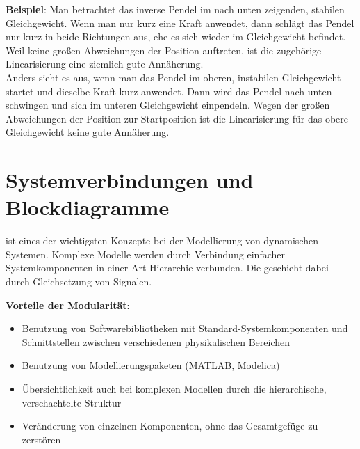 \linie

\textbf{Beispiel}:
Man betrachtet das inverse Pendel im nach unten zeigenden, stabilen Gleichgewicht.
Wenn man nur kurz eine Kraft anwendet, dann schlägt das Pendel nur kurz in beide Richtungen
aus, ehe es sich wieder im Gleichgewicht befindet.
Weil keine großen Abweichungen der Position auftreten, ist die zugehörige Linearisierung eine
ziemlich gute Annäherung.\\
Anders sieht es aus, wenn man das Pendel im oberen, instabilen Gleichgewicht startet
und dieselbe Kraft kurz anwendet.
Dann wird das Pendel nach unten schwingen und sich im unteren Gleichgewicht einpendeln.
Wegen der großen Abweichungen der Position zur Startposition ist die Linearisierung für
das obere Gleichgewicht keine gute Annäherung.

\pagebreak

\section{%
    Systemverbindungen und Blockdiagramme%
}

 ist eines der wichtigsten Konzepte bei der Modellierung von
dynamischen Systemen.
Komplexe Modelle werden durch Verbindung einfacher Systemkomponenten in einer Art Hierarchie
verbunden.
Die  geschieht dabei durch Gleichsetzung von Signalen.

\textbf{Vorteile der Modularität}:
\begin{itemize}
    \item
    Benutzung von Softwarebibliotheken mit Standard-Systemkomponenten und
    Schnittstellen zwischen verschiedenen physikalischen Bereichen

    \item
    Benutzung von Modellierungspaketen (MATLAB, Modelica)

    \item
    Übersichtlichkeit auch bei komplexen Modellen durch die hierarchische, verschachtelte
    Struktur

    \item
    Veränderung von einzelnen Komponenten, ohne das Gesamtgefüge zu zerstören
\end{itemize}

\linie

